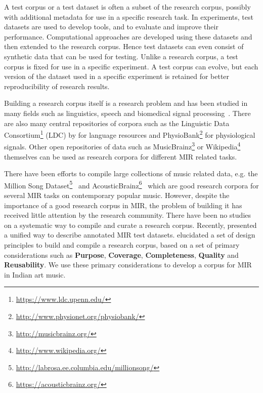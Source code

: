 A test corpus or a test dataset is often a subset of the research corpus, possibly with additional metadata for use in a specific research task. In experiments, test datasets are used to develop tools, and to evaluate and improve their performance. Computational approaches are developed using these datasets and then extended to the research corpus. Hence test datasets can even consist of synthetic data that can be used for testing. Unlike a research corpus, a test corpus is fixed for use in a specific experiment. A test corpus can evolve, but each version of the dataset used in a specific experiment is retained for better reproducibility of research results.

Building a research corpus itself is a research problem and has been studied in many fields such as linguistics, speech and biomedical signal processing~\cite{wynne:05:corpora,pan:02:speechcorpus,cohen:05:biocorpus}. There are also many central repositories of corpora such as the Linguistic Data Consortium\footnote{\url{https://www.ldc.upenn.edu/}} (LDC) by  for language resources and PhysioBank\footnote{\url{http://www.physionet.org/physiobank/}} for physiological signals. Other open repositories of data such as MusicBrainz\footnote{\url{http://musicbrainz.org/}} or Wikipedia\footnote{\url{http://www.wikipedia.org/}} themselves can be used as research corpora for different \gls{MIR} related tasks. 

There have been efforts to compile large collections of music related data, e.g. the Million Song Dataset\footnote{\url{http://labrosa.ee.columbia.edu/millionsong/}}~\cite{bertin:11:MSD} and AcousticBrainz\footnote{\url{https://acousticbrainz.org/}}~\cite{porter:15:acbrainz} which are good research corpora for several \gls{MIR} tasks on contemporary popular music. However, despite the importance of a good research corpus in \gls{MIR}, the problem of building it has received little attention by the research community. There have been no studies on a systematic way to compile and curate a research corpus. Recently,  presented a unified way to describe annotated \gls{MIR} test datasets.  elucidated a set of design principles to build and compile a research corpus, based on a set of primary considerations such as \textbf{Purpose}, \textbf{Coverage}, \textbf{Completeness}, \textbf{Quality} and \textbf{Reusability}. We use these primary considerations to develop a corpus for \gls{MIR} in Indian art music.

